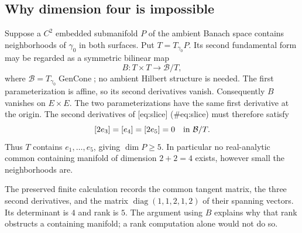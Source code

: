 \documentclass[10pt]{article}
\begin{document}
\subsection*{Why dimension four is impossible}
Suppose a \(C^2\) embedded submanifold \(P\) of the ambient Banach space contains neighborhoods of \(\gamma_0\) in both surfaces. Put \(T=T_{\gamma_0}P\). Its second fundamental form may be regarded as a symmetric bilinear map \[B:T\times T\longrightarrow \mathcal B/T,\] where \(\mathcal B=T_{\gamma_0}\operatorname{GenCone}\); no ambient Hilbert structure is needed. The first parameterization is affine, so its second derivatives vanish. Consequently \(B\) vanishes on \(E\times E\). The two parameterizations have the same first derivative at the origin. The second derivatives of [eq:slice] (\#eq:slice) must therefore satisfy \[[2e_3]=[e_4]=[2e_5]=0\quad\hbox{in }\mathcal B/T.\] Thus \(T\) contains \(e_1,\ldots,e_5\), giving \(\dim P\geq5\). In particular no real-analytic common containing manifold of dimension \(2+2=4\) exists, however small the neighborhoods are.\par
The preserved finite calculation records the common tangent matrix, the three second derivatives, and the matrix \(\operatorname{diag}(1,1,2,1,2)\) of their spanning vectors. Its determinant is \(4\) and rank is \(5\). The argument using \(B\) explains why that rank obstructs a containing manifold; a rank computation alone would not do so.\par
\end{document}
